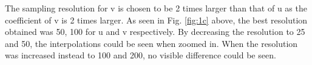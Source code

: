 \documentclass[acmlarge,nonacm=true]{acmart}
\begin{document}
The sampling resolution for v is chosen to be 2 times larger than that of u as the coefficient of v is 
2 times larger. As seen in Fig. \ref{fig:1c} above, the best resolution obtained was 50, 100 for u and v respectively.
By decreasing the resolution to 25 and 50, the interpolations could be seen when zoomed in. When the resolution was increased
instead to 100 and 200, no visible difference could be seen.


\newpage
\end{document}
